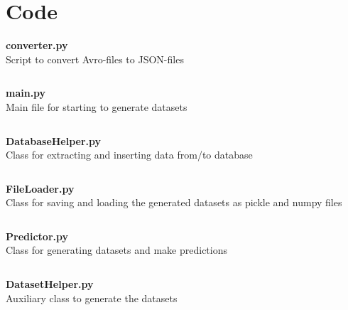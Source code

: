 \chapter{Code}

\textbf{\Large converter.py}\\

Script to convert Avro-files to JSON-files
\inputminted[mathescape,
               linenos,
               numbersep=5pt,
               gobble=2,
               frame=lines,
               framesep=2mm]{python}{../tools/scripts/converter.py}

\newpage

\textbf{\Large main.py}\\

Main file for starting to generate datasets
\inputminted[mathescape,
               linenos,
               numbersep=5pt,
               gobble=2,
               frame=lines,
               framesep=2mm]{python}{../tools/main.py}

\newpage
\textbf{\Large DatabaseHelper.py}\\

Class for extracting and inserting data from/to database 
\inputminted[mathescape,
               linenos,
               numbersep=5pt,
               gobble=2,
               frame=lines,
               framesep=2mm]{python}{../tools/DatasetHelper.py}

\newpage
\textbf{\Large FileLoader.py}\\

Class for saving and loading the generated datasets as pickle and numpy files 
\inputminted[mathescape,
               linenos,
               numbersep=5pt,
               gobble=2,
               frame=lines,
               framesep=2mm]{python}{../tools/FileLoader.py}

\newpage
\textbf{\Large Predictor.py}\\

Class for generating datasets and make predictions
\inputminted[mathescape,
               linenos,
               numbersep=5pt,
               gobble=2,
               frame=lines,
               framesep=2mm]{python}{../tools/Predictor.py}

\newpage
\textbf{\Large DatasetHelper.py}\\

Auxiliary class to generate the datasets
\inputminted[mathescape,
               linenos,
               numbersep=5pt,
               gobble=2,
               frame=lines,
               framesep=2mm]{python}{../tools/DatasetHelper.py}

